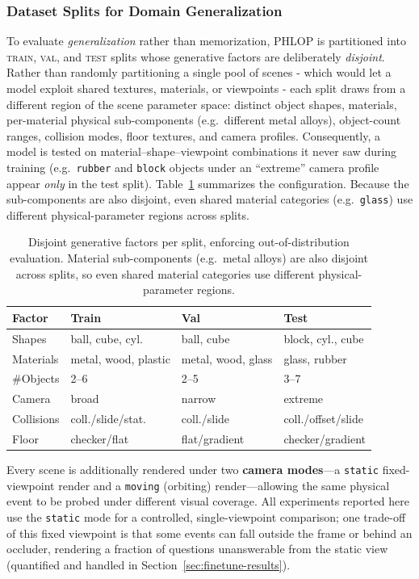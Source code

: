 \documentclass[conference]{IEEEtran}
\begin{document}
\subsubsection{Dataset Splits for Domain Generalization}
\label{sec:splits}
To evaluate \emph{generalization} rather than memorization, PHLOP is partitioned into \textsc{train}, \textsc{val}, and \textsc{test} splits whose generative factors are deliberately \emph{disjoint}. Rather than randomly partitioning a single pool of scenes - which would let a model exploit shared textures, materials, or viewpoints - each split draws from a different region of the scene parameter space: distinct object shapes, materials, per-material physical sub-components (e.g.\ different metal alloys), object-count ranges, collision modes, floor textures, and camera profiles. Consequently, a model is tested on material--shape--viewpoint combinations it never saw during training (e.g.\ \texttt{rubber} and \texttt{block} objects under an ``extreme'' camera profile appear \emph{only} in the test split). Table~\ref{tab:splits} summarizes the configuration. Because the sub-components are also disjoint, even shared material categories (e.g.\ \texttt{glass}) use different physical-parameter regions across splits.
\begin{table}[t]
\centering
\caption{Disjoint generative factors per split, enforcing out-of-distribution evaluation. Material sub-components (e.g.\ metal alloys) are also disjoint across splits, so even shared material categories use different physical-parameter regions.}
\label{tab:splits}
\small
\begin{tabular}{llll}
\toprule
Factor & Train & Val & Test \\
\midrule
Shapes        & ball, cube, cyl.     & ball, cube         & block, cyl., cube \\
Materials     & metal, wood, plastic & metal, wood, glass & glass, rubber \\
\#Objects     & 2--6                 & 2--5               & 3--7 \\
Camera        & broad                & narrow             & extreme \\
Collisions    & coll./slide/stat.    & coll./slide        & coll./offset/slide \\
Floor         & checker/flat         & flat/gradient      & checker/gradient \\
\bottomrule
\end{tabular}
\end{table}
Every scene is additionally rendered under two \textbf{camera modes}---a \texttt{static} fixed-viewpoint render and a \texttt{moving} (orbiting) render---allowing the same physical event to be probed under different visual coverage. All experiments reported here use the \texttt{static} mode for a controlled, single-viewpoint comparison; one trade-off of this fixed viewpoint is that some events can fall outside the frame or behind an occluder, rendering a fraction of questions unanswerable from the static view (quantified and handled in Section~\ref{sec:finetune-results}).
\end{document}
